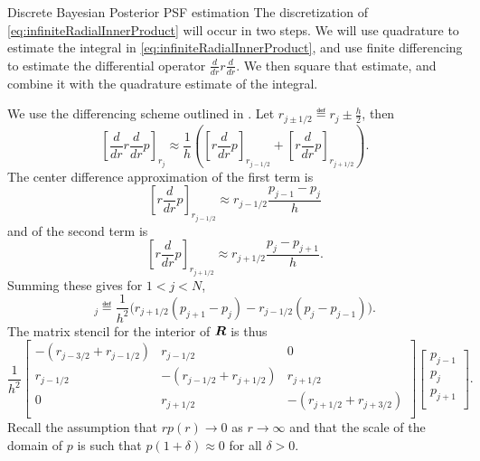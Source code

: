 \begin{chapter}{Discrete Bayesian Posterior PSF estimation}
The discretization of \eqref{eq:infiniteRadialInnerProduct} will occur in two steps. 
We will use quadrature to estimate the integral in \eqref{eq:infiniteRadialInnerProduct}, and use finite differencing to estimate the differential operator $\frac d{dr} r \frac d{dr}$. 
We then square that estimate, and combine it with the quadrature estimate of the integral.

We use the differencing scheme outlined in \citep{morton2005numerical}.
Let $r_{j\pm 1/2}\eqdef r_j \pm \frac h2$, then  
\begin{equation}
  \left[\frac d{dr} r\frac d{dr} p\right]_{r_j} \approx\frac 1h\left( \left[r\frac d{dr}p\right]_{r_{j-1/2}} +  \left[r\frac d{dr}p\right]_{r_{j+1/2}}\right). 
\end{equation}
The center difference approximation of the first term is
\begin{equation}
  \left[r\frac d {dr}p\right]_{r_{j-1/2}} \approx r_{j-1/2} \frac{p_{j-1} - p_{j}}{h}
\end{equation}
and of the second term is
\begin{equation}
  \left[r\frac d {dr}p\right]_{r_{j+1/2}} \approx r_{j+1/2} \frac{p_{j} - p_{j+1}}{h}.
\end{equation}
Summing these gives for $1<j<N$,
\begin{equation}
  [\bm R \bm p]_j \eqdef \frac{1}{h^2} \Big( r_{j+1/2}(p_{j+1} - p_j) - r_{j-1/2}(p_{j} - p_{j-1})\Big).
  \label{laplacian_discretization}
\end{equation}
The matrix stencil for the interior of $\mbox{\boldmath$R$}$ is thus
\begin{equation}
  \frac{1}{h^2}
  \left[\begin{array}{ccc}
    -(r_{j-3/2} + r_{j-1/2}) & r_{j-1/2} & 0             \\
    r_{j-1/2} & -(r_{j-1/2} + r_{j+1/2}) & r_{j+1/2}     \\
    0 & r_{j+1/2} & -(r_{j+1/2} + r_{j+3/2}) \\
  \end{array}\right]
  \left[\begin{array}{c}
    p_{j-1} \\
    p_{j}   \\
    p_{j+1} \\
  \end{array}\right].
  \label{laplacian_discretization_stencil}
\end{equation}
Recall the assumption that $rp(r) \to 0$ as $r\to \infty$ and that the scale of the domain of $p$ is such that $p(1+\delta)\approx 0$ for all $\delta >0$.

\end{chapter}

